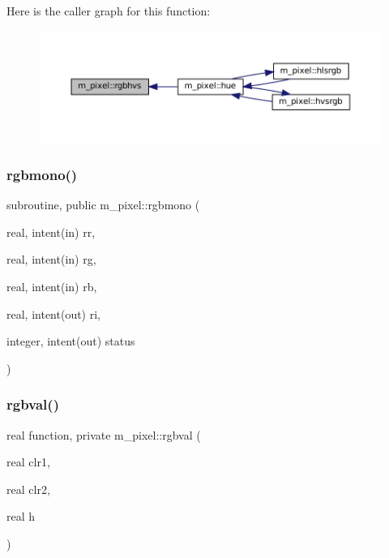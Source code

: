 Here is the caller graph for this function\+:
\nopagebreak
\begin{figure}[H]
\begin{center}
\leavevmode
\includegraphics[width=350pt]{namespacem__pixel_a07ffb197bdcd075f5375e95b43c18915_icgraph}
\end{center}
\end{figure}
\mbox{\label{namespacem__pixel_a63a581cda811571c9ded805516f9d709}} 
\subsubsection{\texorpdfstring{rgbmono()}{rgbmono()}}
{\footnotesize\ttfamily subroutine, public m\+\_\+pixel\+::rgbmono (\begin{DoxyParamCaption}\item[{real, intent(in)}]{rr,  }\item[{real, intent(in)}]{rg,  }\item[{real, intent(in)}]{rb,  }\item[{real, intent(out)}]{ri,  }\item[{integer, intent(out)}]{status }\end{DoxyParamCaption})}

\mbox{\label{namespacem__pixel_a9f8175d7b5b349cd5c30a99100eef5c5}} 
\subsubsection{\texorpdfstring{rgbval()}{rgbval()}}
{\footnotesize\ttfamily real function, private m\+\_\+pixel\+::rgbval (\begin{DoxyParamCaption}\item[{real}]{clr1,  }\item[{real}]{clr2,  }\item[{real}]{h }\end{DoxyParamCaption})\hspace{0.3cm}{\ttfamily [private]}}

